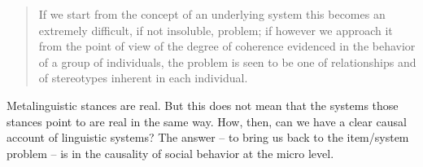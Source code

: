 \begin{quotation}
If we start from the concept of an underlying system this becomes an 
extremely difficult, if not insoluble, problem; if however we approach 
it from the point of view of the degree of coherence evidenced in the 
behavior of a group of individuals, the problem is seen to be one of 
relationships and of stereotypes inherent in each individual.  
\end{quotation}




Metalinguistic stances are real. But this does not mean that the systems 
those stances point to are real in the same way. How, then, can we have a clear 
causal account of linguistic systems? The answer -- to bring us back to the 
item/system problem -- is in the causality of social behavior at the micro 
level.






